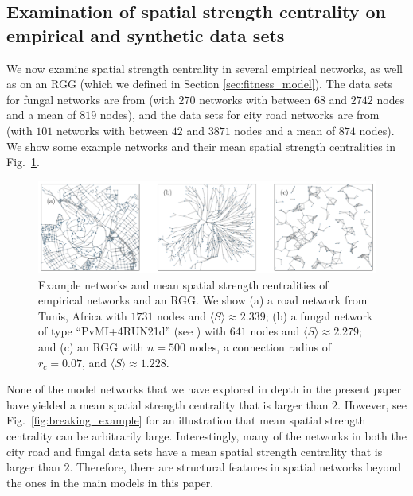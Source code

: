 \documentclass[%
 reprint,
 amsmath,amssymb,
 aps,
]{revtex4-1}
\begin{document}

\subsection{Examination of spatial strength centrality on empirical and synthetic data sets}\label{data}

We now examine spatial strength centrality in several empirical networks, as well as on an RGG (which we defined in {\color{red}Section} \ref{sec:fitness_model}).
The data sets for fungal networks are from \cite{fungal_data} (with $270$ networks with between $68$ and $2742$ nodes and a mean of $819$ nodes), and the data sets for city road networks are from \cite{road_data} (with $101$ networks with between $42$ and $3871$ nodes and a mean of $874$ nodes). We show some example networks and their mean spatial strength centralities in Fig.~\ref{fig:data_network_examples}.


\begin{figure}
    \centering
    \includegraphics[width=1.0\linewidth]{data_network_examples.pdf}
    \caption{Example networks and mean spatial strength centralities of empirical networks and an RGG. We show (a) a road network from Tunis, Africa with $1731$ nodes and $\langle S \rangle \approx 2.339$; (b) a fungal network of type ``Pv\textunderscore M\textunderscore I+4R\textunderscore U\textunderscore N\textunderscore 21d'' (see \cite{fungal_data}) with $641$ nodes and $\langle S \rangle \approx 2.279$; and (c) an RGG with $n = 500$ nodes, a connection radius of $r_c = 0.07$, and $\langle S \rangle \approx 1.228$.
    }
    \label{fig:data_network_examples}
\end{figure}


None of the model networks that we have explored in depth in the present paper have yielded a mean spatial strength centrality that is larger than $2$. However, see Fig.~\ref{fig:breaking_example} for an illustration that mean spatial strength centrality can be arbitrarily large. Interestingly, many of the networks in both the city road and fungal data sets have a mean spatial strength centrality that is larger than $2$. Therefore, there are structural features in spatial networks beyond the ones in the main models in this paper.
\end{document}
